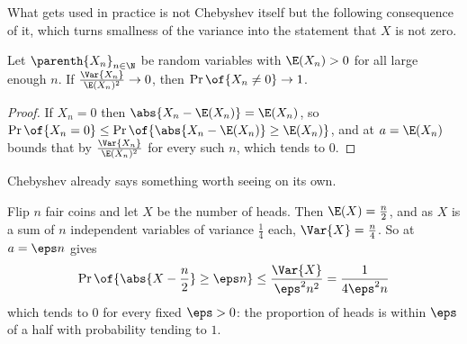 What gets used in practice is not Chebyshev itself but the following consequence of it, which turns smallness of the variance into the statement that $X$ is not zero.

\begin{boxcorollary} \label{Ch1:Cor:Second_Moment}
    Let $\parenth{X_n}_{n \in \N}$ be random variables with $\E(X_n) > 0$ for all large enough $n$. If $\frac{\Var{X_n}}{\E(X_n)^2} \to 0$, then $\Pr\of{X_n \neq 0} \to 1$.
\end{boxcorollary}
\begin{proof}
    If $X_n = 0$ then $\abs{X_n - \E(X_n)} = \E(X_n)$, so $\Pr\of{X_n = 0} \leq \Pr\of{\abs{X_n - \E(X_n)} \geq \E(X_n)}$, and  at $a = \E(X_n)$ bounds that by $\frac{\Var{X_n}}{\E(X_n)^2}$ for every such $n$, which tends to $0$.
\end{proof}

Chebyshev already says something worth seeing on its own.

\begin{boxexample}
    Flip $n$ fair coins and let $X$ be the number of heads. Then $\E(X) = \frac{n}{2}$, and as $X$ is a sum of $n$ independent variables of variance $\frac{1}{4}$ each, $\Var{X} = \frac{n}{4}$. So  at $a = \eps n$ gives
    \begin{align*}
        \Pr\of{\abs{X - \frac{n}{2}} \geq \eps n} \leq \frac{\Var{X}}{\eps^2 n^2} = \frac{1}{4 \eps^2 n}
    \end{align*}
    which tends to $0$ for every fixed $\eps > 0$: the proportion of heads is within $\eps$ of a half with probability tending to $1$.
\end{boxexample}

